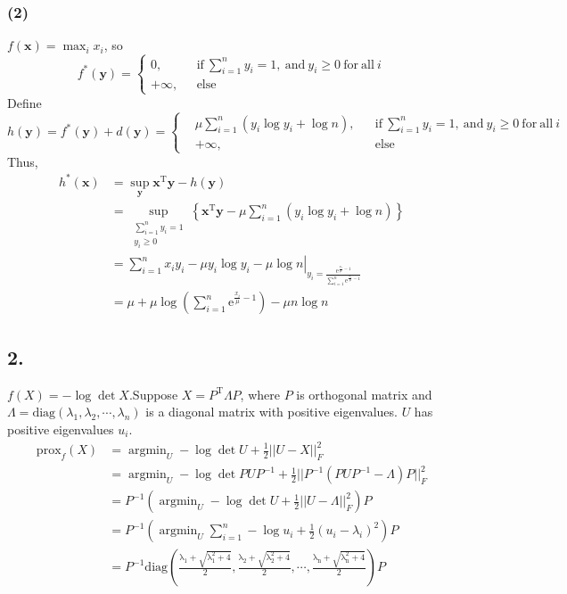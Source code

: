 \documentclass{article}
\begin{document}
\subsubsection*{(2)}
$f(\bm{x})=\max_{i}x_{i}$, so
$$
f^{*}(\bm{y})=\left\{
\begin{aligned}
0,&\ \ \ \mathrm{if}\ \sum_{i=1}^{n}y_{i}=1,\ \mathrm{and}\ y_{i}\geq0\ \mathrm{for\ all\ }i\\
+\infty,&\ \ \ \mathrm{else}
\end{aligned}
\right.
$$
Define
$$
h(\bm{y})=f^{*}(\bm{y})+d(\bm{y})=\left\{
\begin{aligned}
&\mu\sum_{i=1}^{n}\left(y_{i}\log{y_{i}}+\log{n}\right),&&\mathrm{if}\ \sum_{i=1}^{n}y_{i}=1,\ \mathrm{and}\ y_{i}\geq0\ \mathrm{for\ all\ }i\\
&+\infty,&&\mathrm{else}
\end{aligned}
\right.
$$
Thus,
\begin{align*}
h^{*}(\bm{x})&=\sup_{\bm{y}}\bm{x}^{\mathrm{T}}\bm{y}-h(\bm{y})\\
&=\sup_{\substack{\sum_{i=1}^{n}y_{i}=1\\ y_{i}\geq0}}\left\{\bm{x}^{\mathrm{T}}\bm{y}-\mu\sum_{i=1}^{n}\left(y_{i}\log{y_{i}}+\log{n}\right)\right\}\\
&=\left.\sum_{i=1}^{n}x_{i}y_{i}-\mu y_{i}\log{y_{i}-\mu\log{n}}\right|_{y_{i}=\frac{\mathrm{e}^{\frac{x_{i}}{\mu}-1}}{\sum_{i=1}^{n}\mathrm{e}^{\frac{x_{i}}{\mu}-1}}}\\
&=\mu+\mu\log{\left(\sum_{i=1}^{n}\mathrm{e}^{\frac{x_{i}}{\mu}-1}\right)}-\mu n \log{n}
\end{align*}
\subsection*{2.}
$f(X)=-\log{\det{X}}$.Suppose $X=P^{\mathrm{T}}\Lambda P$, where $P$ is orthogonal matrix and $\Lambda=\mathrm{diag}(\lambda_{1},\lambda_{2},\cdots,\lambda_{n})$ is a diagonal matrix with positive eigenvalues.
$U$ has positive eigenvalues $u_{i}$.
\begin{align*}
\mathrm{prox}_{f}(X)&=\mathop{\arg\min}_{U}-\log{\det{U}}+\frac{1}{2}||U-X||^{2}_{F}\\
&=\mathop{\arg\min}_{U}-\log{\det{PUP^{-1}}}+\frac{1}{2}||P^{-1}(PUP^{-1}-\Lambda)P||_{F}^{2}\\
&=P^{-1}\left(\mathop{\arg\min}_{U}-\log{\det{U}}+\frac{1}{2}||U-\Lambda||_{F}^{2}\right)P\\
&=P^{-1}\left(\mathop{\arg\min}_{U}\sum_{i=1}^{n}-\log{u_{i}}+\frac{1}{2}(u_{i}-\lambda_{i})^{2}\right)P\\
&=P^{-1}\mathrm{diag(\frac{\lambda_{1}+\sqrt{\lambda_{1}^{2}+4}}{2},\frac{\lambda_{2}+\sqrt{\lambda_{2}^{2}+4}}{2},\cdots,\frac{\lambda_{n}+\sqrt{\lambda_{n}^{2}+4}}{2})}P
\end{align*}
\end{document}

